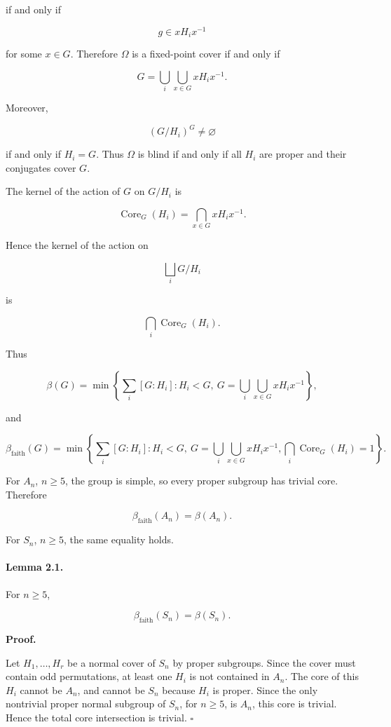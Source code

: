 \documentclass[11pt]{article}
\begin{document}
if and only if

\[
g\in xH_ix^{-1}
\]

for some $x\in G$. Therefore $\Omega$ is a fixed-point cover if and only if

\[
G=\bigcup_i\bigcup_{x\in G}xH_ix^{-1}.
\]

Moreover,

\[
(G/H_i)^G\ne\varnothing
\]

if and only if $H_i=G$. Thus $\Omega$ is blind if and only if all $H_i$ are proper and their conjugates cover $G$.

The kernel of the action of $G$ on $G/H_i$ is

\[
\operatorname{Core}_G(H_i)=\bigcap_{x\in G}xH_ix^{-1}.
\]

Hence the kernel of the action on

\[
\bigsqcup_i G/H_i
\]

is

\[
\bigcap_i \operatorname{Core}_G(H_i).
\]

Thus

\[
\beta(G)
=
\min
\left\{
\sum_i [G:H_i]:
H_i<G,\
G=\bigcup_i\bigcup_{x\in G}xH_ix^{-1}
\right\},
\]

and

\[
\beta_{\mathrm{faith}}(G)
=
\min
\left\{
\sum_i [G:H_i]:
H_i<G,\
G=\bigcup_i\bigcup_{x\in G}xH_ix^{-1},
\bigcap_i\operatorname{Core}_G(H_i)=1
\right\}.
\]

For $A_n$, $n\ge5$, the group is simple, so every proper subgroup has trivial core. Therefore

\[
\beta_{\mathrm{faith}}(A_n)=\beta(A_n).
\]

For $S_n$, $n\ge5$, the same equality holds.

\paragraph{Lemma 2.1.}

For $n\ge5$,

\[
\beta_{\mathrm{faith}}(S_n)=\beta(S_n).
\]

\noindent\textbf{Proof.}

Let $H_1,\dots,H_r$ be a normal cover of $S_n$ by proper subgroups. Since the cover must contain odd permutations, at least one $H_i$ is not contained in $A_n$. The core of this $H_i$ cannot be $A_n$, and cannot be $S_n$ because $H_i$ is proper. Since the only nontrivial proper normal subgroup of $S_n$, for $n\ge5$, is $A_n$, this core is trivial. Hence the total core intersection is trivial. $\square$
\end{document}
